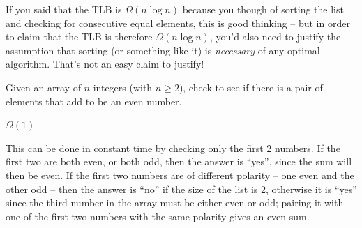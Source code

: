 \begin{prob}
\begin{subprobset}
\begin{subprob}
\begin{soln}
                If you said that the
                TLB is $\Omega(n \log n)$ because you though of sorting the list and
                checking for consecutive equal elements, this is good thinking -- but
                in order to claim that the TLB is therefore $\Omega(n \log n)$, you'd
                also need to justify the assumption that sorting (or something like it)
                is \emph{necessary} of any optimal algorithm. That's not an easy claim
                to justify!
            \end{soln}
        \end{subprob}

        \begin{subprob}
            Given an array of $n$ integers (with $n \geq 2$), check to see if there is
            a pair of elements that add to be an even number.

            \begin{soln}
                $\Omega(1)$

                This can be done in constant time by checking only the first 2 numbers.
                If the first two are both even, or both odd, then the answer is ``yes'',
                since the sum will then be even. If the first two numbers are of different
                polarity -- one even and the other odd -- then the answer is ``no'' if
                the size of the list is 2, otherwise it is ``yes'' since the third number
                in the array must be either even or odd; pairing it with one of the first
                two numbers with the same polarity gives an even sum.
            \end{soln}
        \end{subprob}

    \end{subprobset}

\end{prob}
